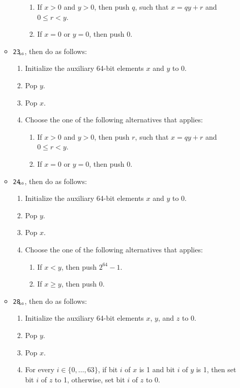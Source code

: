 \documentclass[a4paper,12pt]{article}
\newcommand{\num}[1]{\texttt{#1}\xspace}
\newcommand{\hex}[1]{\num{#1}$_{\textup{\tiny\hskip-1ex 16}}$\xspace}
\newcommand{\range}[2]{\{#1,\ldots,#2\}}
\newcommand{\op}[1]{#1}
\newcommand{\REM}       [1]{\op{\hex{23}}}
\newcommand{\LT}        [1]{\op{\hex{24}}}
\newcommand{\AND}       [1]{\op{\hex{28}}}
\begin{document}
\begin{enumerate}
\begin{itemize}
\begin{enumerate}
      \begin{enumerate}
      \item If $x > 0$ and $y > 0$, then push $q$, such that $x = qy + r$ and $0 \leq r < y$.
      \item If $x = 0$ or $y = 0$, then push 0.
      \end{enumerate}
    \end{enumerate}
  \item \REM{}, then do as follows:
    \begin{enumerate}
    \item Initialize the auxiliary 64-bit elements $x$ and $y$ to 0.
    \item Pop $y$.
    \item Pop $x$.
    \item Choose the one of the following alternatives that applies:
      \begin{enumerate}
      \item If $x > 0$ and $y > 0$, then push $r$, such that $x = qy + r$ and $0 \leq r < y$.
      \item If $x = 0$ or $y = 0$, then push 0.
      \end{enumerate}
    \end{enumerate}
  \item \LT{}, then do as follows:
    \begin{enumerate}
    \item Initialize the auxiliary 64-bit elements $x$ and $y$ to 0.
    \item Pop $y$.
    \item Pop $x$.
    \item Choose the one of the following alternatives that applies:
      \begin{enumerate}
      \item If $x < y$, then push $2^{64} - 1$.
      \item If $x \ge y$, then push 0.
      \end{enumerate}
    \end{enumerate}
  \item \AND{}, then do as follows:
    \begin{enumerate}
    \item Initialize the auxiliary 64-bit elements $x$, $y$, and $z$ to 0.
    \item Pop $y$.
    \item Pop $x$.
    \item For every $i \in \range{0}{63}$, if bit $i$ of $x$ is 1 and bit $i$ of $y$ is 1, then set bit $i$ of $z$ to 1, otherwise, set bit $i$ of $z$ to 0.

\end{enumerate}
\end{itemize}
\end{enumerate}
\end{document}
